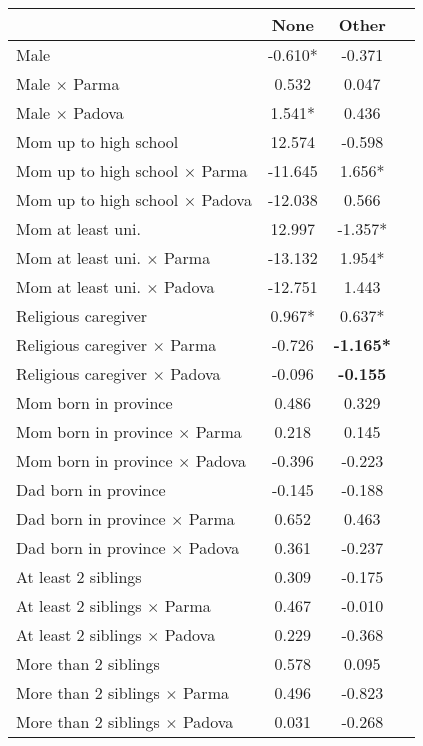 \begin{tabular}{l c c c}
\toprule
& None & Other \\
\midrule
Male & -0.610* &    -0.371 \\
Male $\times$ Parma &     0.532 &     0.047 \\
Male $\times$ Padova & 1.541* &     0.436 \\
Mom up to high school &    12.574 &    -0.598 \\
Mom up to high school $\times$ Parma &   -11.645 & 1.656* \\
Mom up to high school $\times$ Padova &   -12.038 &     0.566 \\
Mom at least uni. &    12.997 & -1.357* \\
Mom at least uni. $\times$ Parma &   -13.132 & 1.954* \\
Mom at least uni. $\times$ Padova &   -12.751 &     1.443 \\
Religious caregiver & 0.967* & 0.637* \\
Religious caregiver $\times$ Parma &    -0.726 & \textbf{-1.165*} \\
Religious caregiver $\times$ Padova &    -0.096 & \textbf{   -0.155} \\
Mom born in province &     0.486 &     0.329 \\
Mom born in province $\times$ Parma &     0.218 &     0.145 \\
Mom born in province $\times$ Padova &    -0.396 &    -0.223 \\
Dad born in province &    -0.145 &    -0.188 \\
Dad born in province $\times$ Parma &     0.652 &     0.463 \\
Dad born in province $\times$ Padova &     0.361 &    -0.237 \\
At least 2 siblings &     0.309 &    -0.175 \\
At least 2 siblings $\times$ Parma &     0.467 &    -0.010 \\
At least 2 siblings $\times$ Padova &     0.229 &    -0.368 \\
More than 2 siblings &     0.578 &     0.095 \\
More than 2 siblings $\times$ Parma &     0.496 &    -0.823 \\
More than 2 siblings $\times$ Padova &     0.031 &    -0.268 \\
\bottomrule
\end{tabular}
